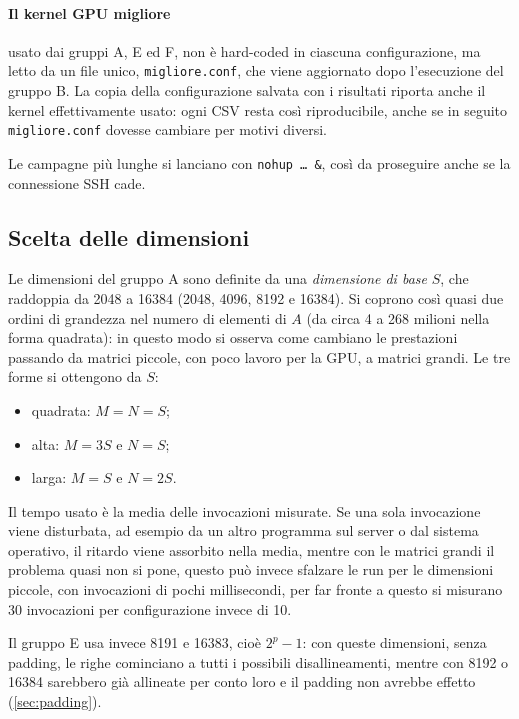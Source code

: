 \documentclass[11pt,a4paper]{article}
\begin{document}
\paragraph{Il kernel GPU migliore} usato dai gruppi
A, E ed F, non è hard-coded in ciascuna configurazione, ma letto da un file unico,
\texttt{migliore.conf}, che viene aggiornato dopo l'esecuzione del gruppo B. La copia della
configurazione salvata con i risultati riporta anche il kernel effettivamente
usato: ogni CSV resta così riproducibile, anche se in seguito
\texttt{migliore.conf} dovesse cambiare per motivi diversi.

Le campagne più lunghe si lanciano con
\texttt{nohup \dots\ \&}, così da proseguire anche se la connessione SSH cade.

\subsection{Scelta delle dimensioni}\label{sec:dimensioni}

Le dimensioni del gruppo A sono definite da una \emph{dimensione di base} $S$,
che raddoppia da 2048 a 16384 (2048, 4096, 8192 e 16384). Si coprono così quasi due ordini di grandezza nel numero di
elementi di $A$ (da circa 4 a 268 milioni nella forma quadrata): in questo modo
si osserva come cambiano le prestazioni passando da matrici piccole, con poco
lavoro per la GPU, a matrici grandi. Le tre forme si ottengono da $S$:
\begin{itemize}
  \item quadrata: $M = N = S$;
  \item alta: $M = 3S$ e $N = S$;
  \item larga: $M = S$ e $N = 2S$.
\end{itemize}

Il tempo usato è la media
delle invocazioni misurate. Se una sola invocazione viene disturbata, ad
esempio da un altro programma sul server o dal sistema operativo, il ritardo
viene assorbito nella media, mentre con le matrici grandi il problema quasi non si pone,
questo può invece sfalzare le run per le dimensioni piccole,
con invocazioni di pochi millisecondi, per far fronte a questo si misurano 30
invocazioni per configurazione invece di 10.

Il gruppo E usa invece 8191
e 16383, cioè $2^p - 1$: con queste dimensioni, senza padding, le righe
cominciano a tutti i possibili disallineamenti, mentre con 8192 o 16384
sarebbero già allineate per conto loro e il padding non avrebbe effetto
(\cref{sec:padding}).
\end{document}
